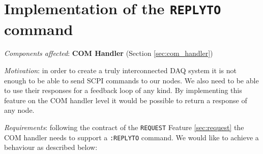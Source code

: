 \section{Implementation of the \texttt{REPLYTO} command}
\label{sec:replyto}

\textit{Components affected}: \textbf{COM Handler} (Section \ref{sec:com_handler})

\textit{Motivation}: in order to create a truly interconnected DAQ system it is not enough to be able to send SCPI commands to our nodes. We also need to be able to use their responses for a feedback loop of any kind. By implementing this feature on the COM handler level it  would be possible to return a response of any node.

\textit{Requirements}: following the contract of the \texttt{REQUEST} Feature \ref{sec:request} the COM handler needs to support a \texttt{:REPLYTO} command. We would like to achieve a behaviour as described below:

